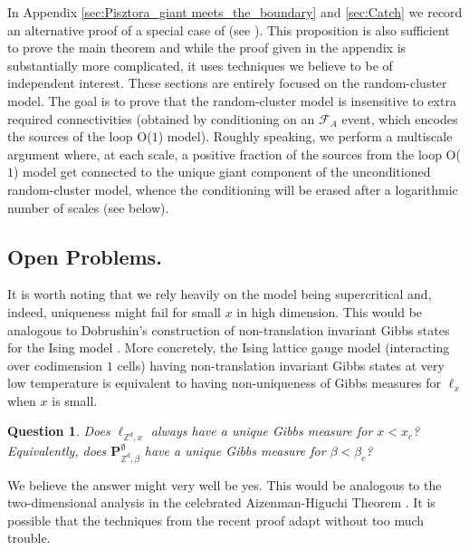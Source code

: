 \documentclass[article,11pt,reqno]{amsart}
\newcommand{\Z}{\mathbb{Z}}
\newtheorem{question}[theorem]{Question}
\begin{document}
In Appendix \ref{sec:Pisztora_giant meets_the_boundary} and \ref{sec:Catch} we record an alternative proof of a special case of   (see ).  This proposition is also sufficient to prove the main theorem and while the proof given in the appendix is substantially more complicated, it uses techniques we believe to be of independent interest. These sections  are entirely focused on the random-cluster model.
The goal is to prove that the random-cluster model is insensitive to extra required connectivities (obtained by conditioning on an $\mathcal{F}_A$ event, which encodes the sources of the loop O($1$) model). Roughly speaking, we perform a multiscale argument where, at each scale, a positive fraction of the sources from the loop O($1$) model get connected to the unique giant component of the unconditioned random-cluster model, whence the conditioning will be erased after a logarithmic number of scales (see  below). 




\subsection{Open Problems.}
 It is worth noting that we rely heavily on the model being supercritical and, indeed, uniqueness might fail for small $x$ in high dimension. This would be analogous to Dobrushin's construction of non-translation invariant Gibbs states for the Ising model \cite{DobrushinStates}. More concretely, the Ising lattice gauge model (interacting over codimension $1$ cells) having non-translation invariant Gibbs states at very low temperature is equivalent to having non-uniqueness of Gibbs measures for $\ell_x$ when $x$ is small.

\begin{question}
Does $\ell_{\Z^d,x}$ always have a unique Gibbs measure for $x < x_c$? Equivalently, does $\mathbf{P}^{\emptyset}_{\Z^d,\beta}$ have a unique Gibbs measure for $\beta<\beta_c$?
\end{question}

We believe the answer might very well be yes. This would be analogous to the two-dimensional analysis in the celebrated Aizenman-Higuchi Theorem \cite{aizenman1980translation,higuchi1981absence}. It is possible that the techniques from the recent proof \cite{Coquille_Trans} adapt without too much trouble.
\end{document}
